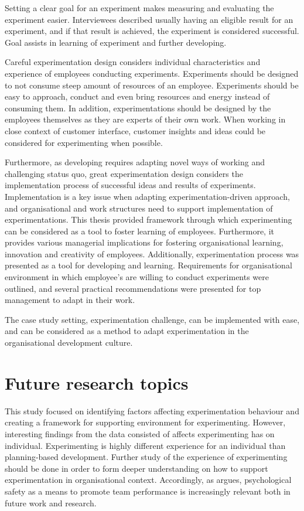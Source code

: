 Setting a clear goal for an experiment makes measuring and evaluating the experiment easier. Interviewees described usually having an eligible result for an experiment, and if that result is achieved, the experiment is considered successful. Goal assists in learning of experiment and further developing. 

Careful experimentation design considers individual characteristics and experience of employees conducting experiments. Experiments should be designed to not consume steep amount of resources of an employee. Experiments should be easy to approach, conduct and even bring resources and energy instead of consuming them. In addition, experimentations should be designed by the employees themselves as they are experts of their own work. When working in close context of customer interface, customer insights and ideas could be considered for experimenting when possible. 

Furthermore, as developing requires adapting novel ways of working and challenging status quo, great experimentation design considers the implementation process of successful ideas and results of experiments. Implementation is a key issue when adapting experimentation-driven approach, and organisational and work structures need to support implementation of experimentations. 
This thesis provided framework through which experimenting can be considered as a tool to foster learning of employees. Furthermore, it provides various managerial implications for fostering organisational learning, innovation and creativity of employees. Additionally, experimentation process was presented as a tool for developing and learning. Requirements for organisational environment in which employee's are willing to conduct experiments were outlined, and several practical recommendations were presented for top management to adapt in their work.

The case study setting, experimentation challenge, can be implemented with ease, and can be considered as a method to adapt experimentation in the organisational development culture. 

\section{Future research topics}
This study focused on identifying factors affecting experimentation behaviour and creating a framework for supporting environment for experimenting. However, interesting findings from the data consisted of affects experimenting has on individual. Experimenting is highly different experience for an individual than planning-based development. Further study of the experience of experimenting should be done in order to form deeper understanding on how to support experimentation in organisational context. Accordingly, as \citet{edmondson1999psychological} argues, psychological safety as a means to promote team performance is increasingly relevant both in future work and research. 

